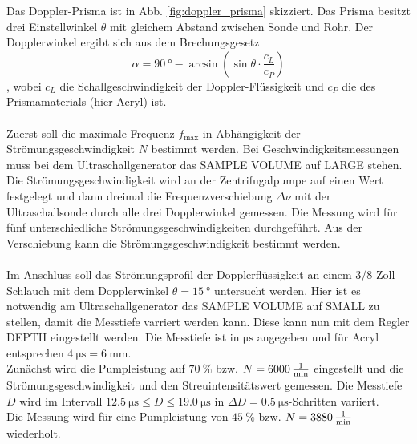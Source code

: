 Das Doppler-Prisma ist in Abb. \ref{fig:doppler_prisma} skizziert.
Das Prisma besitzt drei Einstellwinkel $\theta$ mit gleichem Abstand zwischen Sonde und Rohr.
Der Dopplerwinkel ergibt sich aus dem Brechungsgesetz
\begin{equation}
    \alpha = \SI{90}{\degree} - \arcsin \left( \sin \theta \cdot \frac{c_L}{c_P} \right)
    \label{eqn:dopplerwinkel}
\end{equation}
, wobei $c_L$ die Schallgeschwindigkeit der Doppler-Flüssigkeit und $c_P$ die des Prismamaterials (hier Acryl) ist.
\\
\\
Zuerst soll die maximale Frequenz $f_\text{max}$ in Abhängigkeit der Strömungsgeschwindigkeit $N$ bestimmt werden.
Bei Geschwindigkeitsmessungen muss bei dem Ultraschallgenerator das SAMPLE VOLUME auf LARGE stehen.
Die Strömungsgeschwindigkeit wird an der Zentrifugalpumpe auf einen Wert festgelegt und dann dreimal die Frequenzverschiebung $\Delta \nu$ mit der Ultraschallsonde durch alle drei Dopplerwinkel gemessen.
Die Messung wird für fünf unterschiedliche Strömungsgeschwindigkeiten durchgeführt.
Aus der Verschiebung kann die Strömungsgeschwindigkeit bestimmt werden.
\\
\\
Im Anschluss soll das Strömungsprofil der Dopplerflüssigkeit an einem 3/8 Zoll -Schlauch mit dem Dopplerwinkel $\theta = \SI{15}{\degree}$ untersucht werden.
Hier ist es notwendig am Ultraschallgenerator das SAMPLE VOLUME auf SMALL zu stellen, damit die Messtiefe varriert werden kann.
Diese kann nun mit dem Regler DEPTH eingestellt werden.
Die Messtiefe ist in $\si{\micro\second}$ angegeben und für Acryl entsprechen $\SI{4}{\micro\second} = \SI{6}{\milli\metre}$.\\
Zunächst wird die Pumpleistung auf $\SI{70}{\percent}$ bzw. $N = \SI{6000}{\frac{1}{\minute}}$ eingestellt und die Strömungsgeschwindigkeit und den Streuintensitätswert gemessen.
Die Messtiefe $D$ wird im Intervall $\SI{12.5}{\micro\second} \leq D \leq \SI{19.0}{\micro\second}$ in $\Delta D = \SI{0.5}{\micro\second}$-Schritten variiert.\\
Die Messung wird für eine Pumpleistung von $\SI{45}{\percent}$ bzw. $N = \SI{3880}{\frac{1}{\minute}}$ wiederholt.
